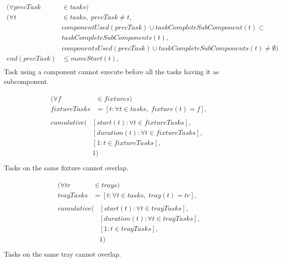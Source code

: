  \begin{equation}
 \begin{aligned}\label{eq:103}
 (\forall precTask &\in tasks) \\
 (\forall t &\in tasks, \; precTask \neq t,\\
 &componentUsed(precTask) \cup taskCompleteSubComponent(t) \subset\\
 &taskCompleteSubComponents(t),\\
 &componentsUsed(precTask) \cup taskCompleteSubComponents(t) \neq \emptyset)\\
 end(precTask) &\leq moveStart(t), \\
 \end{aligned}
 \end{equation}
 Task using a component cannot execute before all the tasks having it as subcomponent.
 
 \begin{equation}
 \begin{aligned}\label{eq:104}
 &\begin{aligned}
 (\forall f &\in fixtures) \\
 fixtureTasks &= [t : \forall t \in tasks, \; fixture(t) = f], 
 \end{aligned}\\
 &\begin{aligned}
 cumulative(&[start(t) : \forall t \in fixtureTasks],\\
 &[duration(t) : \forall t \in fixtureTasks],\\
 &[1 : t \in fixtureTasks],\\
 &1)
 \end{aligned}\\
 \end{aligned}
 \end{equation}
 Tasks on the same fixture cannot overlap.
 
 \begin{equation}
 \begin{aligned}\label{eq:105}
 &\begin{aligned}
 (\forall tr &\in trays) \\
 trayTasks &= [t : \forall t \in tasks, \; tray(t) = tr], 
 \end{aligned}\\
 &\begin{aligned}
 cumulative(&[start(t) : \forall t \in trayTasks],\\
 &[duration(t) : \forall t \in trayTasks],\\
 &[1 : t \in trayTasks],\\
 &1)
 \end{aligned}\\
 \end{aligned}
 \end{equation}
 Tasks on the same tray cannot overlap.
 
